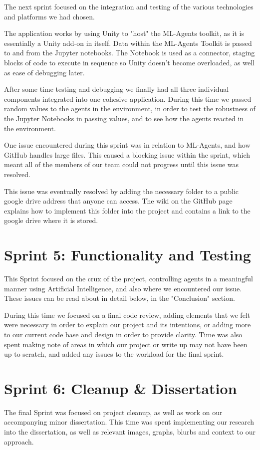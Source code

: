	The next sprint focused on the integration and testing of the various technologies and platforms we had chosen. 
	
	The application works by using Unity to "host" the ML-Agents toolkit, as it is essentially a Unity add-on in itself. Data within the ML-Agents Toolkit is passed to and from the Jupyter notebooks. The Notebook is used as a connector, staging blocks of code to execute in sequence so Unity doesn't become overloaded, as well as ease of debugging later.
	
	After some time testing and debugging we finally had all three individual components integrated into one cohesive application. During this time we passed random values to the agents in the environment, in order to test the robustness of the Jupyter Notebooks in passing values, and to see how the agents reacted in the environment.
	
	One issue encountered during this sprint was in relation to ML-Agents, and how GitHub handles large files. This caused a blocking issue within the sprint, which meant all of the members of our team could not progress until this issue was resolved. 
	
	This issue was eventually resolved by adding the necessary folder to a public google drive address that anyone can access. The wiki on the GitHub page explains how to implement this folder into the project and contains a link to the google drive where it is stored.


\section{Sprint 5: Functionality and Testing}
	
	This Sprint focused on the crux of the project, controlling agents in a meaningful manner using Artificial Intelligence, and also where we encountered our issue. These issues can be read about in detail below, in the "Conclusion" section. 
	
	During this time we focused on a final code review, adding elements that we felt were necessary in order to explain our project and its intentions, or adding more to our current code base and design in order to provide clarity.
	Time was also spent making note of areas in which our project or write up may not have been up to scratch, and added any issues to the workload for the final sprint.


\section{Sprint 6: Cleanup \& Dissertation} 

	The final Sprint was focused on project cleanup, as well as work on our accompanying minor dissertation. This time was spent implementing our research into the dissertation, as well as relevant images, graphs, blurbs and context to our approach.  
